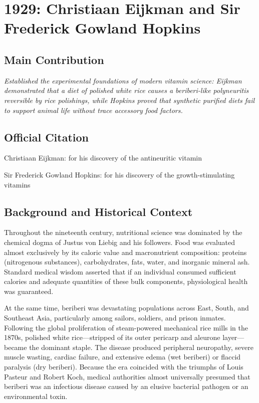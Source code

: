 \chapter[1929 --- Eijkman et al.]{1929: Christiaan Eijkman and Sir Frederick Gowland Hopkins}
\label{ch:1929_Eijkman_Hopkins}

\section*{Main Contribution}

\textit{Established the experimental foundations of modern vitamin science: Eijkman demonstrated that a diet of polished white rice causes a beriberi-like polyneuritis reversible by rice polishings, while Hopkins proved that synthetic purified diets fail to support animal life without trace accessory food factors.}\cite{nobel-1929,lecture-1929,lecture-hopkins-1929}

\section{Official Citation}

Christiaan Eijkman: for his discovery of the antineuritic vitamin

Sir Frederick Gowland Hopkins: for his discovery of the growth-stimulating vitamins

\section{Background and Historical Context}

Throughout the nineteenth century, nutritional science was dominated by the chemical dogma of Justus von Liebig and his followers. Food was evaluated almost exclusively by its caloric value and macronutrient composition: proteins (nitrogenous substances), carbohydrates, fats, water, and inorganic mineral ash. Standard medical wisdom asserted that if an individual consumed sufficient calories and adequate quantities of these bulk components, physiological health was guaranteed.

At the same time, beriberi was devastating populations across East, South, and Southeast Asia, particularly among sailors, soldiers, and prison inmates. Following the global proliferation of steam-powered mechanical rice mills in the 1870s, polished white rice—stripped of its outer pericarp and aleurone layer—became the dominant staple. The disease produced peripheral neuropathy, severe muscle wasting, cardiac failure, and extensive edema (wet beriberi) or flaccid paralysis (dry beriberi). Because the era coincided with the triumphs of Louis Pasteur and Robert Koch, medical authorities almost universally presumed that beriberi was an infectious disease caused by an elusive bacterial pathogen or an environmental toxin.

